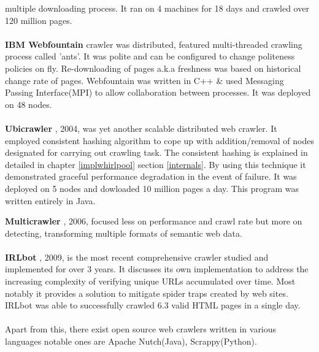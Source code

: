 multiple downloading process. It ran on 4 machines for 18 days and crawled over 120 million pages.
\\
\\
\textbf{IBM Webfountain} crawler was distributed, featured multi-threaded crawling process called 'ants'.
It was polite and can be configured to change politeness policies on fly. Re-downloading of pages a.k.a
freshness was based on historical change rate of pages. Webfountain was written in C++ \& used Messaging
Passing Interface(MPI) to allow collaboration between processes. It was deployed on 48 nodes.
\\
\\
\textbf{Ubicrawler} \cite{ubicrawler}, 2004, was yet another scalable distributed web crawler. It employed
consistent hashing algorithm to cope up with addition/removal of nodes designated for carrying out crawling
task. The consistent hashing is explained in detailed in chapter \ref{implwhirlpool} section \ref{internals}. By using this technique it demonstrated graceful performance degradation in the event of failure. It was
deployed on 5 nodes and dowloaded 10 million pages a day. This program was written entirely in Java.
\\
\pagebreak

\noindent
\textbf{Multicrawler} \cite{multicrawler}, 2006, focused less on performance and crawl rate but more on
detecting, transforming multiple formats of semantic web data.
\\
\\
\textbf{IRLbot} \cite{irlbot}, 2009, is the most recent comprehensive crawler studied and implemented for
over 3 years. It discusses its own implementation to address the increasing complexity of verifying unique
URLs accumulated over time. Most notably it provides a solution to mitigate spider traps created by web sites. IRLbot was able to successfully crawled 6.3 valid HTML pages in a single day.
\\
\\
Apart from this, there exist open source web crawlers written in various languages notable ones are Apache Nutch(Java), Scrappy(Python).

